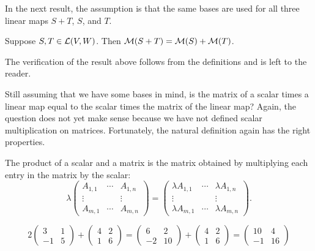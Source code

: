 In the next result, the assumption is that the same bases are used for all
three linear maps $S+T$, $S$, and $T$.

\begin{result}\label{ax:3.35}
Suppose $S,T\in\mathcal{L}(V,W)$. Then $\mathcal{M}(S+T)=\mathcal{M}(S)+\mathcal{M}(T)$.
\end{result}

The verification of the result above follows from the definitions and is left
to the reader.

Still assuming that we have some bases in mind, is the matrix of a scalar times
a linear map equal to the scalar times the matrix of the linear map? Again, the
question does not yet make sense because we have not defined scalar
multiplication on matrices. Fortunately, the natural definition again has the
right properties.

\begin{definition}\label{ax:3.36}
The product of a scalar and a matrix is the matrix obtained by multiplying each
entry in the matrix by the scalar:
\[ \lambda\begin{pmatrix} A_{1,1} & \cdots & A_{1,n}\\ \vdots & & \vdots\\
   A_{m,1} & \cdots & A_{m,n} \end{pmatrix}
 = \begin{pmatrix} \lambda A_{1,1} & \cdots & \lambda A_{1,n}\\
   \vdots & & \vdots\\
   \lambda A_{m,1} & \cdots & \lambda A_{m,n} \end{pmatrix}. \]
\end{definition}

\begin{example}\label{ax:3.37}
\leavevmode
\[ 2\begin{pmatrix} 3 & 1\\ -1 & 5 \end{pmatrix}
   + \begin{pmatrix} 4 & 2\\ 1 & 6 \end{pmatrix}
 = \begin{pmatrix} 6 & 2\\ -2 & 10 \end{pmatrix}
   + \begin{pmatrix} 4 & 2\\ 1 & 6 \end{pmatrix}
 = \begin{pmatrix} 10 & 4\\ -1 & 16 \end{pmatrix} \]
\end{example}

